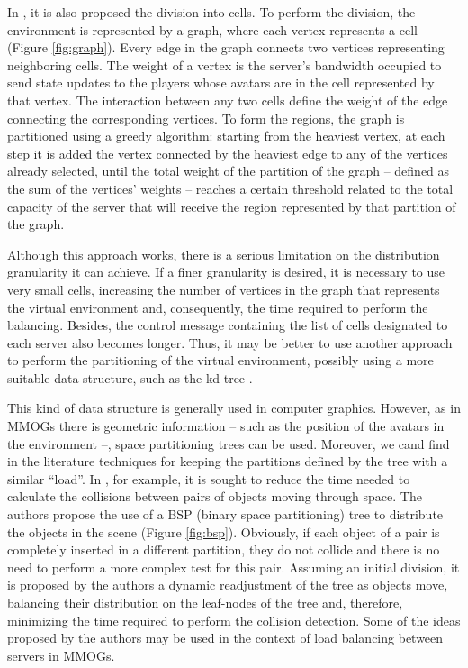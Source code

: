 \documentclass[acmjacm]{acmtrans2m}
\begin{document}
In \cite{bezerra2009lbs}, it is also proposed the division into cells. To perform the division, the environment is represented by a graph, where each vertex represents a cell (Figure \ref{fig:graph}). Every edge in the graph connects two vertices representing neighboring cells. The weight of a vertex is the server's bandwidth occupied to send state updates to the players whose avatars are in the cell represented by that vertex. The interaction between any two cells define the weight of the edge connecting the corresponding vertices. To form the regions, the graph is partitioned using a greedy algorithm: starting from the heaviest vertex, at each step it is added the vertex connected by the heaviest edge to any of the vertices already selected, until the total weight of the partition of the graph -- defined as the sum of the vertices' weights -- reaches a certain threshold related to the total capacity of the server that will receive the region represented by that partition of the graph.

Although this approach works, there is a serious limitation on the distribution granularity it can achieve. If a finer granularity is desired, it is necessary to use very small cells, increasing the number of vertices in the graph that represents the virtual environment and, consequently, the time required to perform the balancing. Besides, the control message containing the list of cells designated to each server also becomes longer. Thus, it may be better to use another approach to perform the partitioning of the virtual environment, possibly using a more suitable data structure, such as the kd-tree \cite{bentley1975mbs}.

This kind of data structure is generally used in computer graphics. However, as in MMOGs there is geometric information -- such as the position of the avatars in the environment --, space partitioning trees can be used. Moreover, we cand find in the literature techniques for keeping the partitions defined by the tree with a similar ``load''. In \cite{luque2005bpc}, for example, it is sought to reduce the time needed to calculate the collisions between pairs of objects moving through space. The authors propose the use of a BSP (binary space partitioning) tree to distribute the objects in the scene (Figure \ref{fig:bsp}). Obviously, if each object of a pair is completely inserted in a different partition, they do not collide and there is no need to perform a more complex test for this pair. Assuming an initial division, it is proposed by the authors a dynamic readjustment of the tree as objects move, balancing their distribution on the leaf-nodes of the tree and, therefore, minimizing the time required to perform the collision detection. Some of the ideas proposed by the authors may be used in the context of load balancing between servers in MMOGs.
\end{document}
